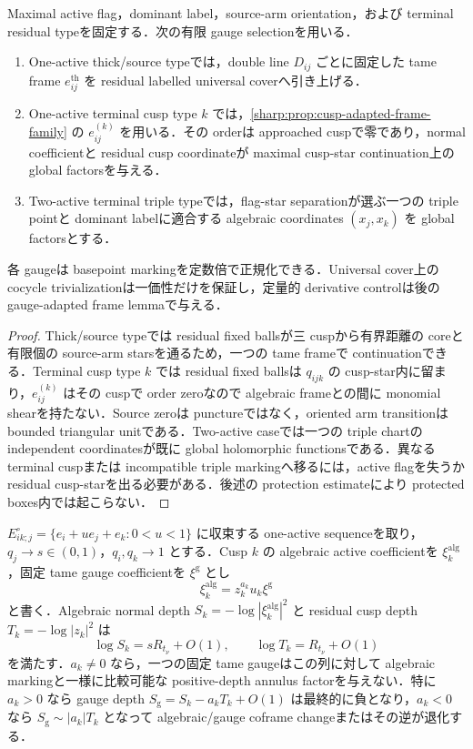 \documentclass[a4paper,11pt]{ltjsarticle}
\numberwithin{equation}{section}
\theoremstyle{plain}
\theoremstyle{definition}
\theoremstyle{remark}
\begin{document}
\begin{proposition}\label{sharp:prop:canonical-global-gauges}
Maximal active flag，dominant label，source-arm orientation，および terminal residual typeを固定する．次の有限 gauge selectionを用いる．
\begin{enumerate}[label=\textup{(G\arabic*)}]
\item One-active thick/source typeでは，double line $D_{ij}$ ごとに固定した tame frame $e^{\mathrm{th}}_{ij}$ を residual labelled universal coverへ引き上げる．
\item One-active terminal cusp type $k$ では，\cref{sharp:prop:cusp-adapted-frame-family} の $e^{(k)}_{ij}$ を用いる．その orderは approached cuspで零であり，normal coefficientと residual cusp coordinateが maximal cusp-star continuation上の global factorsを与える．
\item Two-active terminal triple typeでは，flag-star separationが選ぶ一つの triple pointと dominant labelに適合する algebraic coordinates $(x_j,x_k)$ を global factorsとする．
\end{enumerate}
各 gaugeは basepoint markingを定数倍で正規化できる．Universal cover上の cocycle trivializationは一価性だけを保証し，定量的 derivative controlは後の gauge-adapted frame lemmaで与える．
\end{proposition}

\begin{proof}
Thick/source typeでは residual fixed ballsが三 cuspから有界距離の coreと有限個の source-arm starsを通るため，一つの tame frameで continuationできる．Terminal cusp type $k$ では residual fixed ballsは $q_{ijk}$ の cusp-star内に留まり，$e^{(k)}_{ij}$ はその cuspで order zeroなので algebraic frameとの間に monomial shearを持たない．Source zeroは punctureではなく，oriented arm transitionは bounded triangular unitである．Two-active caseでは一つの triple chartの independent coordinatesが既に global holomorphic functionsである．異なる terminal cuspまたは incompatible triple markingへ移るには，active flagを失うか residual cusp-starを出る必要がある．後述の protection estimateにより protected boxes内では起こらない．
\end{proof}

\begin{lemma}\label{sharp:lem:fast-cusp-fixed-gauge-obstruction}
$E_{ik;j}^{\circ}=\{e_i+ue_j+e_k:0<u<1\}$ に収束する one-active sequenceを取り，$q_j\to s\in(0,1)$，$q_i,q_k\to1$ とする．Cusp $k$ の algebraic active coefficientを $\xi_k^{\mathrm{alg}}$，固定 tame gauge coefficientを $\xi^{\mathrm g}$ とし
\[
 \xi_k^{\mathrm{alg}}=z_k^{a_k}u_k\xi^{\mathrm g}
\]
と書く．Algebraic normal depth $S_k=-\log|\xi_k^{\mathrm{alg}}|^2$ と residual cusp depth $T_k=-\log|z_k|^2$ は
\[
 \log S_k=sR_{t_\nu}+O(1),\qquad
 \log T_k=R_{t_\nu}+O(1)
\]
を満たす．$a_k\ne0$ なら，一つの固定 tame gaugeはこの列に対して algebraic markingと一様に比較可能な positive-depth annulus factorを与えない．特に $a_k>0$ なら gauge depth $S_{\mathrm g}=S_k-a_kT_k+O(1)$ は最終的に負となり，$a_k<0$ なら $S_{\mathrm g}\sim |a_k|T_k$ となって algebraic/gauge coframe changeまたはその逆が退化する．
\end{lemma}
\end{document}
